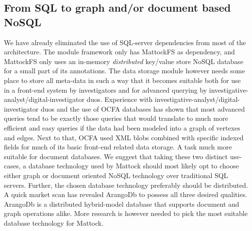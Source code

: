 \subsection{From SQL to graph and/or document based NoSQL}
We have already eliminated the use of SQL-server dependencies from most of the architecture. The module framework only has MattockFS as dependency, and MattockFS only uses an in-memory \emph{distributed} key/value store NoSQL database for a small part of its annotations. The data storage module however needs some place to store all meta-data in such a way that it becomes suitable both for use in a front-end system by investigators and for advanced querying by investigative-analyst/digital-investigator duos. Experience with investigative-analyst/digital-investigator duos and the use of OCFA databases has shown that most advanced queries tend to be exactly those queries that would translate to much more efficient and easy queries if the data had been modeled into a graph of vertexes and edges. Next to that, OCFA used XML blobs combined with specific indexed fields for much of its basic front-end related data storage. A task much more suitable for document databases. We suggest that taking these two distinct use-cases, a database technology used by Mattock should most likely opt to choose either graph or document oriented NoSQL technology over traditional SQL servers. Further, the chosen database technology preferably should be distributed. A quick market scan has revealed ArangoDb to possess all three desired qualities. ArangoDb is a distributed hybrid-model database that supports document and graph operations alike. More research is however needed to pick the most suitable database technology for Mattock.

